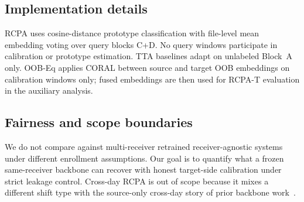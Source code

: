 \subsection{Implementation details}
RCPA uses cosine-distance prototype classification with file-level mean embedding voting over query blocks C+D.
No query windows participate in calibration or prototype estimation.
TTA baselines adapt on unlabeled Block~A only.
OOB-Eq applies CORAL between source and target OOB embeddings on calibration windows only; fused embeddings are then used for RCPA-T evaluation in the auxiliary analysis.

\subsection{Fairness and scope boundaries}
We do not compare against multi-receiver retrained receiver-agnostic systems under different enrollment assumptions.
Our goal is to quantify what a frozen same-receiver backbone can recover with honest target-side calibration under strict leakage control.
Cross-day RCPA is out of scope because it mixes a different shift type with the source-only cross-day story of prior backbone work~\cite{paper1_placeholder}.


